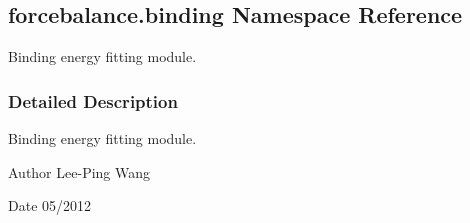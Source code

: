 \hypertarget{namespaceforcebalance_1_1binding}{}\subsection{forcebalance.\+binding Namespace Reference}
\label{namespaceforcebalance_1_1binding}


Binding energy fitting module.  




\subsubsection{Detailed Description}
Binding energy fitting module. 

\begin{DoxyAuthor}{Author}
Lee-\/\+Ping Wang 
\end{DoxyAuthor}
\begin{DoxyDate}{Date}
05/2012 
\end{DoxyDate}
